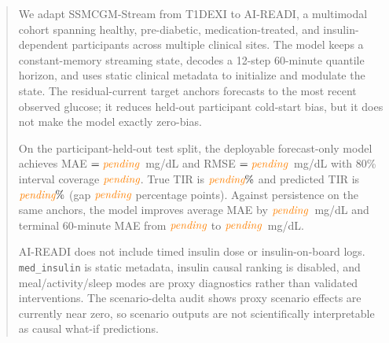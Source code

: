 \begin{abstract}
We adapt SSMCGM-Stream from T1DEXI to AI-READI, a multimodal cohort spanning healthy, pre-diabetic, medication-treated, and insulin-dependent participants across multiple clinical sites. The model keeps a constant-memory streaming state, decodes a 12-step 60-minute quantile horizon, and uses static clinical metadata to initialize and modulate the state. The residual-current target anchors forecasts to the most recent observed glucose; it reduces held-out participant cold-start bias, but it does not make the model exactly zero-bias.

On the participant-held-out test split, the deployable forecast-only model achieves MAE $=\maeFo$~mg/dL and RMSE $=\rmseFo$~mg/dL with 80\% interval coverage $\covFo$. True TIR is $\tirTrue\%$ and predicted TIR is $\tirPredicted\%$ (gap $\tirGap$ percentage points). Against persistence on the same anchors, the model improves average MAE by $\persistenceDeltaMae$~mg/dL and terminal 60-minute MAE from $\persistenceTerminalMAE$ to $\modelTerminalMAE$~mg/dL.

AI-READI does not include timed insulin dose or insulin-on-board logs. \texttt{med\_insulin} is static metadata, insulin causal ranking is disabled, and meal/activity/sleep modes are proxy diagnostics rather than validated interventions. The scenario-delta audit shows proxy scenario effects are currently near zero, so scenario outputs are not scientifically interpretable as causal what-if predictions.
\end{abstract}
